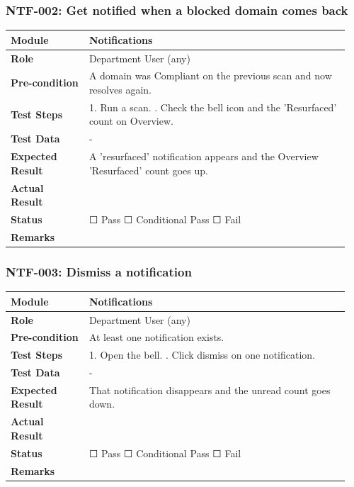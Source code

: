 \documentclass[10pt]{article}
\begin{document}
\subsubsection*{NTF-002: Get notified when a blocked domain comes back}
\begin{longtable}{p{0.22\linewidth}p{0.73\linewidth}}
\hline
\textbf{Module} & Notifications \\ \hline
\textbf{Role} & Department User (any) \\ \hline
\textbf{Pre-condition} & A domain was Compliant on the previous scan and now resolves again. \\ \hline
\textbf{Test Steps} & 1. Run a scan. \newline 2. Check the bell icon and the 'Resurfaced' count on Overview. \\ \hline
\textbf{Test Data} & - \\ \hline
\textbf{Expected Result} & A 'resurfaced' notification appears and the Overview 'Resurfaced' count goes up. \\ \hline
\textbf{Actual Result} & \newline \newline \\ \hline
\textbf{Status} & ☐ Pass \quad ☐ Conditional Pass \quad ☐ Fail \\ \hline
\textbf{Remarks} & \newline \\ \hline
\end{longtable}
\subsubsection*{NTF-003: Dismiss a notification}
\begin{longtable}{p{0.22\linewidth}p{0.73\linewidth}}
\hline
\textbf{Module} & Notifications \\ \hline
\textbf{Role} & Department User (any) \\ \hline
\textbf{Pre-condition} & At least one notification exists. \\ \hline
\textbf{Test Steps} & 1. Open the bell. \newline 2. Click dismiss on one notification. \\ \hline
\textbf{Test Data} & - \\ \hline
\textbf{Expected Result} & That notification disappears and the unread count goes down. \\ \hline
\textbf{Actual Result} & \newline \newline \\ \hline
\textbf{Status} & ☐ Pass \quad ☐ Conditional Pass \quad ☐ Fail \\ \hline
\textbf{Remarks} & \newline \\ \hline
\end{longtable}
\end{document}
